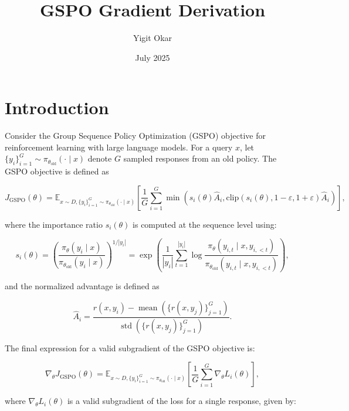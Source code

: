 \documentclass{article}
\title{GSPO Gradient Derivation}
\author{Yigit Okar}
\date{July 2025}
\begin{document}
\maketitle

\section{Introduction}

Consider the Group Sequence Policy Optimization (GSPO) objective for reinforcement learning with large language models. For a query $x$, let $\{ y_i \}_{i=1}^G \sim \pi_{\theta_{\text{old}}}(\cdot \mid x)$ denote $G$ sampled responses from an old policy. The GSPO objective is defined as

$$
J_{\text{GSPO}}(\theta) = \mathbb{E}_{x \sim D, \{y_i\}_{i=1}^G \sim \pi_{\theta_{\text{old}}}(\cdot \mid x)} \left[ \frac{1}{G} \sum_{i=1}^G \min\left( s_i(\theta) \hat{A}_i, \text{clip}(s_i(\theta), 1 - \varepsilon, 1 + \varepsilon) \hat{A}_i \right) \right],
$$

where the importance ratio $s_i(\theta)$ is computed at the sequence level using:

$$
s_i(\theta) = \left( \frac{\pi_\theta(y_i \mid x)}{\pi_{\theta_{\text{old}}}(y_i \mid x)} \right)^{1 / |y_i|} = \exp\left( \frac{1}{|y_i|} \sum_{t=1}^{|y_i|} \log \frac{\pi_\theta(y_{i,t} \mid x, y_{i,<t})}{\pi_{\theta_{\text{old}}}(y_{i,t} \mid x, y_{i,<t})} \right),
$$

and the normalized advantage is defined as

$$
\hat{A}_i = \frac{r(x, y_i) - \operatorname{mean}(\{ r(x, y_j) \}_{j=1}^G)}{\operatorname{std}(\{ r(x, y_j) \}_{j=1}^G)}.
$$

 The final expression for a valid subgradient of the GSPO objective is:

$$
\nabla_\theta J_{\text{GSPO}}(\theta) = \mathbb{E}_{x \sim D, \{y_i\}_{i=1}^G \sim \pi_{\theta_{\text{old}}}(\cdot \mid x)} \left[ \frac{1}{G} \sum_{i=1}^G \nabla_\theta L_i(\theta) \right],
$$

where $\nabla_\theta L_i(\theta)$ is a valid subgradient of the loss for a single response, given by:
\end{document}
